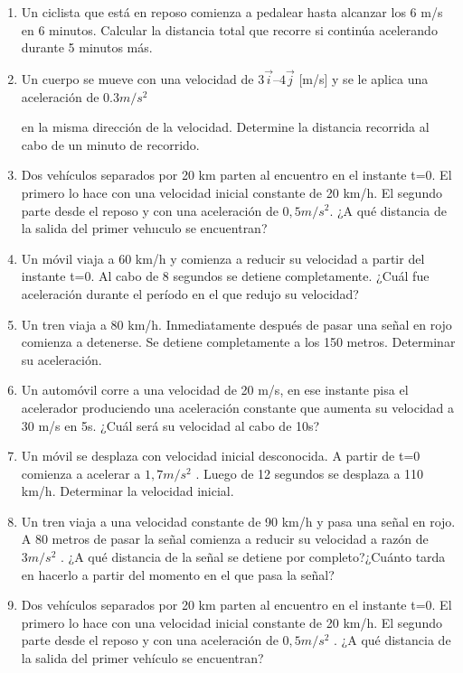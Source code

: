 \begin{enumerate}
 \item Un ciclista que está en reposo comienza a pedalear hasta alcanzar los 6 m/s en 6 minutos. Calcular la distancia total que 
recorre si continúa acelerando durante 5 minutos más.

\item  Un cuerpo se mueve con una velocidad de $3 \vec{i} – 4\vec{j}$ [m/s] y
 se le aplica una aceleración de $0.3 m/s^2$

 en la misma dirección de la velocidad. Determine la
 distancia recorrida al cabo de un minuto de recorrido.

 
\item Dos vehículos separados por 20 km parten al encuentro
 en el instante t=0. El primero lo hace con una velocidad inicial 
constante de 20 km/h. El
 segundo parte desde el reposo y con una aceleración de $0,5 m/s^2$. ¿A qué distancia de la
 salida del 
primer vehııculo se encuentran? 

\item Un móvil viaja a 60 km/h y comienza a reducir su velocidad a partir del instante t=0. Al
 cabo de 8 segundos se detiene 
completamente. ¿Cuál fue aceleración durante el período en el que redujo su
 velocidad?

\item Un tren viaja a 80 km/h. Inmediatamente después de pasar una señal en rojo comienza a
 detenerse. Se detiene completamente 
a los 150 metros. Determinar su aceleración.

\item Un automóvil corre a una velocidad 
 de 20 m/s, en ese instante pisa el acelerador produciendo una aceleración constante 
que aumenta 
su velocidad a 30 m/s en 5s. ¿Cuál será su velocidad al cabo de 10s?

\item Un móvil se desplaza con velocidad inicial desconocida. A partir de t=0 comienza a acelerar
 a $1,7 m/s^2$
. Luego de 12 
segundos se desplaza a 110 km/h. Determinar la velocidad inicial.

\item Un tren viaja a una velocidad constante de 90 km/h y pasa una señal en rojo. A 80 metros
 de pasar la señal comienza a 
reducir su velocidad a razón de $3m/s^2$
. ¿A qué distancia de la señal se detiene
 por completo?¿Cuánto tarda en hacerlo a 
partir del momento en el que pasa la señal?

\item Dos vehículos separados por 20 km parten al encuentro en el instante t=0. El primero lo
 hace con una velocidad inicial 
constante de 20 km/h. El segundo parte desde el reposo y con una aceleración
 de $0,5 m/s^2$
 . ¿A qué distancia de la salida 
del primer vehículo se encuentran?


\end{enumerate}
